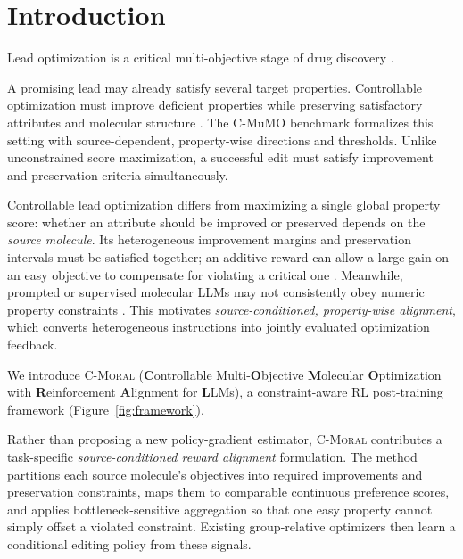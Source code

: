 \documentclass[11pt]{article}
\newcommand{\YS}[1]{\textcolor{blue}{\emph{[YS: #1]}}}
\begin{document}
\section{Introduction}

Lead optimization is a critical multi-objective stage of drug discovery \cite{katsuno2015hit,sadybekov2023computational,guan2019admet}.

A promising lead may already satisfy several target properties. Controllable optimization must improve deficient properties while preserving satisfactory attributes and molecular structure \cite{fialkova2021libinvent,zhou2024decompoptcontrollabledecomposeddiffusion}. The C-MuMO benchmark \cite{dey2025large} formalizes this setting with source-dependent, property-wise directions and thresholds. Unlike unconstrained score maximization, a successful edit must satisfy improvement and preservation criteria simultaneously.





Controllable lead optimization differs from maximizing a single global property score: whether an attribute should be improved or preserved depends on the \emph{source molecule}. Its heterogeneous improvement margins and preservation intervals must be satisfied together; an additive reward can allow a large gain on an easy objective to compensate for violating a critical one \cite{wang2024multi,park2025mol}. Meanwhile, prompted or supervised molecular LLMs may not consistently obey numeric property constraints \cite{ye2023drugassistlargelanguagemodel}. This motivates \emph{source-conditioned, property-wise alignment}, which converts heterogeneous instructions into jointly evaluated optimization feedback.


We introduce \textsc{C-Moral} (\textbf{C}ontrollable Multi-\textbf{O}bjective \textbf{M}olecular \textbf{O}ptimization with \textbf{R}einforcement \textbf{A}lignment for \textbf{L}LMs), a constraint-aware RL post-training framework (Figure~\ref{fig:framework}).

Rather than proposing a new policy-gradient estimator, \textsc{C-Moral} contributes a task-specific \emph{source-conditioned reward alignment} formulation. The method partitions each source molecule's objectives into required improvements and preservation constraints, maps them to comparable continuous preference scores, and applies bottleneck-sensitive aggregation so that one easy property cannot simply offset a violated constraint. Existing group-relative optimizers then learn a conditional editing policy from these signals. 
\end{document}
